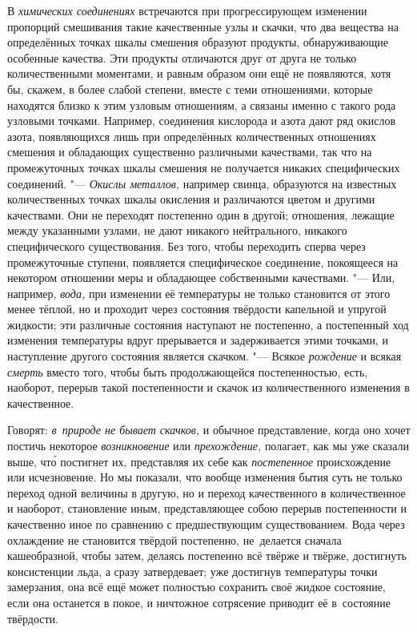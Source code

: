 В {\em химических соединениях} встречаются при прогрессирующем изменении
пропорций смешивания такие качественные узлы и скачки, что два вещества на
определённых точках шкалы смешения образуют продукты, обнаруживающие особенные
качества. Эти продукты отличаются друг от друга не только количественными
моментами, и равным образом они ещё не появляются, хотя бы, скажем, в более
слабой степени, вместе с теми отношениями, которые находятся близко к этим
узловым отношениям, а связаны именно с такого рода узловыми точками. Например,
соединения кислорода и азота дают ряд окислов азота, появляющихся лишь при
определённых количественных отношениях смешения и обладающих существенно
различными качествами, так что на промежуточных точках шкалы смешения не
получается никаких специфических соединений. "--- {\em Окислы металлов,}
например свинца, образуются на известных количественных точках шкалы окисления
и различаются цветом и другими качествами. Они не переходят постепенно один в
другой; отношения, лежащие между указанными узлами, не дают никакого
нейтрального, никакого специфического существования. Без того, чтобы переходить
сперва через промежуточные ступени, появляется специфическое соединение,
покоящееся на некотором отношении меры и обладающее собственными качествами.
"--- Или, например, {\em вода,} при изменении её температуры не только
становится от этого менее тёплой, но и проходит через состояния твёрдости
капельной и упругой жидкости; эти различные состояния наступают не постепенно,
а постепенный ход изменения температуры вдруг прерывается и задерживается этими
точками, и наступление другого состояния является скачком. "--- Всякое
{\em рождение} и всякая {\em смерть} вместо того, чтобы быть продолжающейся
постепенностью, есть, наоборот, перерыв такой постепенности и скачок из
количественного изменения в качественное.

Говорят: {\em в~природе не бывает скачков,} и обычное представление, когда оно
хочет постичь некоторое {\em возникновение} или {\em прехождение,} полагает,
как мы уже сказали выше, чт\'{о} постигнет их, представляя их себе как
{\em постепенное} происхождение или исчезновение. Но мы показали, что вообще
изменения бытия суть не только переход одной величины в другую, но и переход
качественного в количественное и наоборот, становление иным, представляющее
собою перерыв постепенности и качественно иное по сравнению с предшествующим
существованием. Вода через охлаждение не становится твёрдой постепенно,
не~делается сначала кашеобразной, чтобы затем, делаясь постепенно всё твёрже и
твёрже, достигнуть консистенции льда, а сразу затвердевает; уже достигнув
температуры точки замерзания, она всё ещё может полностью сохранить своё жидкое
состояние, если она останется в покое, и ничтожное сотрясение приводит её
в~состояние твёрдости.

